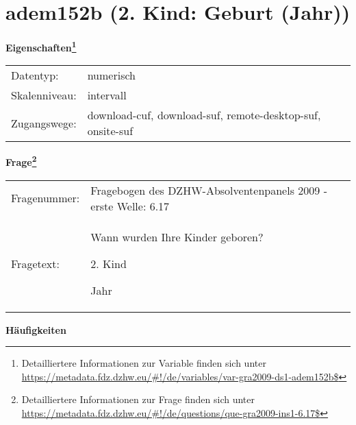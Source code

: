 
    \setcounter{footnote}{0}

    \vspace*{-1.8cm}
	\section{adem152b (2. Kind: Geburt (Jahr))}
	\label{section:adem152b}



    \vspace*{0.5cm}
    \noindent\textbf{Eigenschaften\footnote{Detailliertere Informationen zur Variable finden sich unter
		\url{https://metadata.fdz.dzhw.eu/\#!/de/variables/var-gra2009-ds1-adem152b$}}}\\
	\begin{tabularx}{\hsize}{@{}lX}
	Datentyp: & numerisch \\
	Skalenniveau: & intervall \\
	Zugangswege: &
	  download-cuf, 
	  download-suf, 
	  remote-desktop-suf, 
	  onsite-suf
 \\
    \end{tabularx}



				\vspace*{0.5cm}
                \noindent\textbf{Frage\footnote{Detailliertere Informationen zur Frage finden sich unter
		              \url{https://metadata.fdz.dzhw.eu/\#!/de/questions/que-gra2009-ins1-6.17$}}}\\
				\begin{tabularx}{\hsize}{@{}lX}
					Fragenummer: &
					  Fragebogen des DZHW-Absolventenpanels 2009 - erste Welle:
					  6.17
 \\
					Fragetext: & Wann wurden Ihre Kinder geboren?\par  2. Kind\par  Jahr \\
				\end{tabularx}





        		\vspace*{0.5cm}
                \noindent\textbf{Häufigkeiten}

